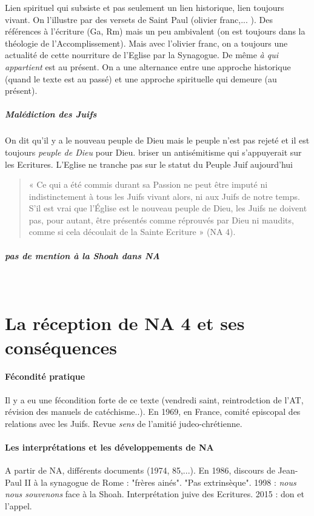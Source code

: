 Lien spirituel qui subsiste et pas seulement un lien historique, lien toujours vivant. On l'illustre par des versets de Saint Paul (olivier franc,... ). Des références à l'écriture (Ga, Rm) mais un peu ambivalent (on est toujours dans la théologie de l'Accomplissement). Mais avec l'olivier franc, on a toujours une actualité de cette nourriture de l'Eglise par la Synagogue. De même \textit{à qui appartient} est au présent. On a une alternance entre une approche historique (quand le texte est au passé) et une approche spirituelle qui demeure (au présent).

\subparagraph{Malédiction des Juifs} On dit qu'il y a le nouveau peuple de Dieu mais le peuple n'est pas rejeté et il est toujours \textit{peuple de Dieu} pour Dieu. briser un antisémitisme qui s'appuyerait sur les Ecritures. L'Eglise ne tranche pas sur le statut du Peuple Juif aujourd'hui

\begin{quote}
    «  Ce  qui  a  été  commis  durant  sa  Passion  ne  peut  être  imputé  ni  indistinctement  à  tous  les  Juifs vivant  alors,  ni  aux  Juifs  de  notre  temps.  S’il  est  vrai  que  l’Église  est  le  nouveau  peuple  de Dieu,  les  Juifs  ne  doivent  pas,  pour  autant,  être  présentés  comme  réprouvés  par  Dieu  ni maudits, comme  si  cela  découlait  de  la  Sainte  Ecriture  »  (NA  4). 

\end{quote}
\subparagraph{pas de mention à la Shoah dans NA} 

 ~
 
  \section{La réception de NA 4 et ses
  conséquences}

    
    \paragraph{Fécondité pratique}
Il y a eu une fécondition forte de ce texte (vendredi saint, reintrodction de l'AT, révision des manuels de catéchisme..). En 1969, en France, comité episcopal des relations avec les Juifs. Revue \textit{sens} de l'amitié judeo-chrétienne.     
  
    
    \paragraph{Les interprétations et les développements de NA}
    A partir de NA, différents documents (1974, 85,...). En 1986, discours de Jean-Paul II à la synagogue de Rome : "frères ainés". "Pas extrinsèque". 1998 : \textit{nous nous souvenons} face à la Shoah. 
    Interprétation juive des Ecritures.
    2015 : don et l'appel.
  
